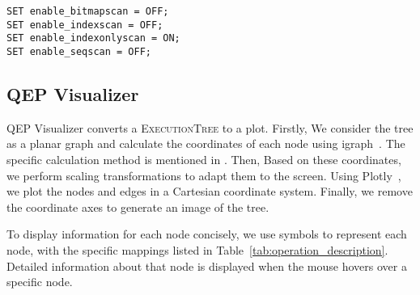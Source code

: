 \begin{lstlisting}
SET enable_bitmapscan = OFF;
SET enable_indexscan = OFF;
SET enable_indexonlyscan = ON;
SET enable_seqscan = OFF;
\end{lstlisting}

\subsection{QEP Visualizer}

QEP Visualizer converts a \textsc{ExecutionTree} to a plot. Firstly,  We consider the tree as a planar graph and calculate the coordinates of each node using igraph~\cite{igraph}. The specific calculation method is mentioned in \cite{reingold1981tidier}. Then, Based on these coordinates, we perform scaling transformations to adapt them to the screen. Using Plotly~\cite{plotly}, we plot the nodes and edges in a Cartesian coordinate system. Finally, we remove the coordinate axes to generate an image of the tree.

To display information for each node concisely, we use symbols to represent each node, with the specific mappings listed in Table~\ref{tab:operation_description}. Detailed information about that node is displayed when the mouse hovers over a specific node.

